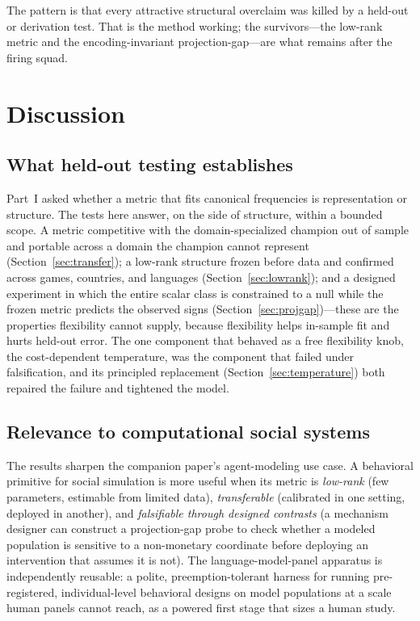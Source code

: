 \documentclass[journal]{IEEEtran}
\begin{document}
The pattern is that every attractive structural overclaim was killed by a held-out or derivation test.
That is the method working; the survivors---the low-rank metric and the encoding-invariant projection-gap---are what remains after the firing squad.

\section{Discussion}
\label{sec:discussion}

\subsection{What held-out testing establishes}
Part~I asked whether a metric that fits canonical frequencies is representation or structure.
The tests here answer, on the side of structure, within a bounded scope.
A metric competitive with the domain-specialized champion out of sample and portable across a domain the champion cannot represent (Section~\ref{sec:transfer}); a low-rank structure frozen before data and confirmed across games, countries, and languages (Section~\ref{sec:lowrank}); and a designed experiment in which the entire scalar class is constrained to a null while the frozen metric predicts the observed signs (Section~\ref{sec:projgap})---these are the properties flexibility cannot supply, because flexibility helps in-sample fit and hurts held-out error.
The one component that behaved as a free flexibility knob, the cost-dependent temperature, was the component that failed under falsification, and its principled replacement (Section~\ref{sec:temperature}) both repaired the failure and tightened the model.

\subsection{Relevance to computational social systems}
The results sharpen the companion paper's agent-modeling use case.
A behavioral primitive for social simulation is more useful when its metric is \emph{low-rank} (few parameters, estimable from limited data), \emph{transferable} (calibrated in one setting, deployed in another), and \emph{falsifiable through designed contrasts} (a mechanism designer can construct a projection-gap probe to check whether a modeled population is sensitive to a non-monetary coordinate before deploying an intervention that assumes it is not).
The language-model-panel apparatus is independently reusable: a polite, preemption-tolerant harness for running pre-registered, individual-level behavioral designs on model populations at a scale human panels cannot reach, as a powered first stage that sizes a human study.
\end{document}
